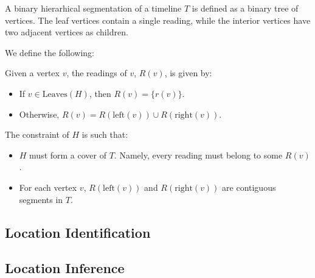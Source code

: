 \begin{definition}
    A binary hierarhical segmentation of a timeline $T$ is defined as a binary
    tree of vertices.  The leaf vertices contain a single reading, while the
    interior vertices have two adjacent vertices as children.
    \label{def:h-seg}
\end{definition}

We define the following:

Given a vertex $v$, the readings of $v$, $R(v)$, is given by:
\begin{itemize}
    \item If $v\in \mathrm{Leaves}(H)$, then $R(v) = \{r(v)\}$.
    \item Otherwise, $R(v) = R(\mathrm{left}(v)) \cup R(\mathrm{right}(v))$.
\end{itemize}

The constraint of $H$ is such that:

\begin{itemize}
    \item $H$ must form a cover of $T$.  Namely, every reading must belong to
        some $R(v)$.
    \item For each vertex $v$, $R(\mathrm{left}(v))$ and $R(\mathrm{right}(v))$
        are contiguous segments in $T$.
\end{itemize}

\subsection{Location Identification}



\subsection{Location Inference}
